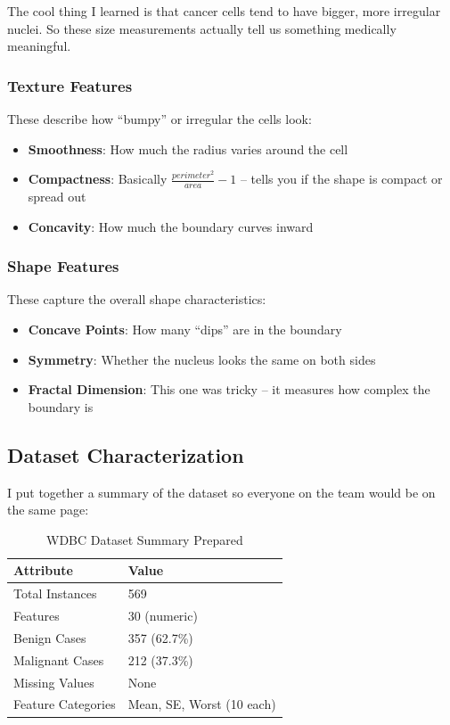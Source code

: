 \documentclass[12pt]{article}
\begin{document}
The cool thing I learned is that cancer cells tend to have bigger, more irregular nuclei. So these size measurements actually tell us something medically meaningful.

\subsubsection{Texture Features}
These describe how ``bumpy'' or irregular the cells look:
\begin{itemize}
    \item \textbf{Smoothness}: How much the radius varies around the cell
    \item \textbf{Compactness}: Basically $\frac{perimeter^2}{area} - 1$ -- tells you if the shape is compact or spread out
    \item \textbf{Concavity}: How much the boundary curves inward
\end{itemize}

\subsubsection{Shape Features}
These capture the overall shape characteristics:
\begin{itemize}
    \item \textbf{Concave Points}: How many ``dips'' are in the boundary
    \item \textbf{Symmetry}: Whether the nucleus looks the same on both sides
    \item \textbf{Fractal Dimension}: This one was tricky -- it measures how complex the boundary is
\end{itemize}

\subsection{Dataset Characterization}

I put together a summary of the dataset so everyone on the team would be on the same page:

\begin{table}[H]
\centering
\caption{WDBC Dataset Summary Prepared}
\begin{tabular}{|l|l|}
\hline
\textbf{Attribute} & \textbf{Value} \\ \hline
Total Instances & 569 \\ \hline
Features & 30 (numeric) \\ \hline
Benign Cases & 357 (62.7\%) \\ \hline
Malignant Cases & 212 (37.3\%) \\ \hline
Missing Values & None \\ \hline
Feature Categories & Mean, SE, Worst (10 each) \\ \hline
\end{tabular}
\end{table}
\end{document}
